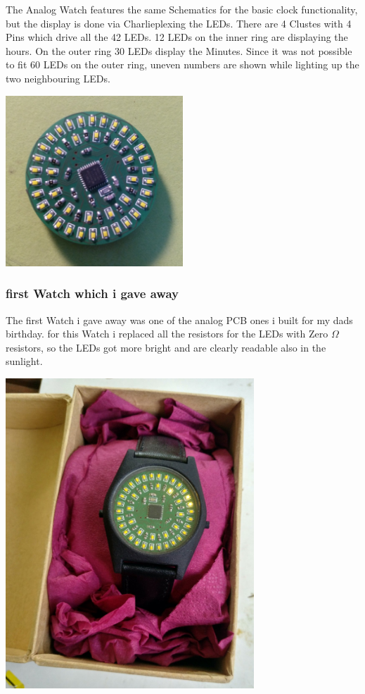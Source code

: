 The Analog Watch features the same Schematics for the basic clock functionality, but the display is done via Charlieplexing the LEDs. There are 4 Clustes with 4 Pins which drive all the 42 LEDs. 12 LEDs on the inner ring are displaying the hours. On the outer ring 30 LEDs display the Minutes. Since it was not possible to fit 60 LEDs on the outer ring, uneven numbers are shown while lighting up the two neighbouring LEDs.
\begin{center}
  \includegraphics[width=0.5\textwidth]{../Pictures/AnalogPCB.jpg}
\end{center}
\newpage
\subsubsection{first Watch which i gave away}
The first Watch i gave away was one of the analog PCB ones i built for my dads birthday.
for this Watch i replaced all the resistors for the LEDs with Zero $\Omega$ resistors, so the LEDs got more bright and are clearly readable also in the sunlight.
\begin{center}
  \includegraphics[width=0.7\textwidth]{../Pictures/AnalogWatch1.jpg}
\end{center}

